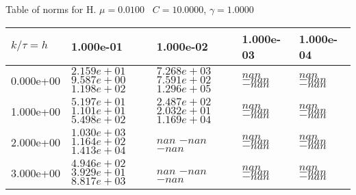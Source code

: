 \begin{center}
Table of norms for H. $\mu = 0.0100$ \, $C = 10.0000$, $\gamma = 1.0000$
  
\begin{tabular}{|p{1in}|p{1in}|p{1in}|p{1in}|p{1in}|} \hline
$k / \tau = h$ &1.000e-01 &1.000e-02 &1.000e-03 &1.000e-04 \\ \hline 
0.000e+00 & $2.159e+01$  $9.587e+00$  $1.198e+02$  & $7.268e+03$  $7.591e+02$  $1.296e+05$  & $nan$  $-nan$  $-nan$  & $nan$  $-nan$  $-nan$  \\ \hline 
1.000e+00 & $5.197e+01$  $1.101e+01$  $5.498e+02$  & $2.487e+02$  $2.032e+01$  $1.169e+04$  & $nan$  $-nan$  $-nan$  & $nan$  $-nan$  $-nan$  \\ \hline 
2.000e+00 & $1.030e+03$  $1.164e+02$  $1.413e+04$  & $nan$  $-nan$  $-nan$  & $nan$  $-nan$  $-nan$  & $nan$  $-nan$  $-nan$  \\ \hline 
3.000e+00 & $4.946e+02$  $3.929e+01$  $8.817e+03$  & $nan$  $-nan$  $-nan$  & $nan$  $-nan$  $-nan$  & $nan$  $-nan$  $-nan$  \\ \hline 

\end{tabular}\\[20pt]
\end{center}
